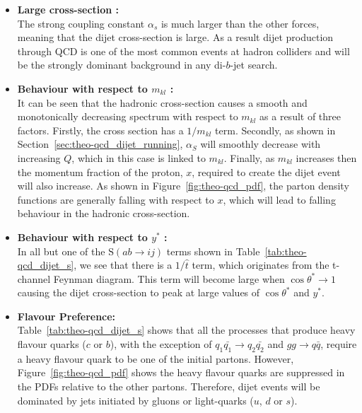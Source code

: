 \begin{itemize}[leftmargin=*]
\item\textbf{Large cross-section :}\\
  The strong coupling constant $\alpha_s$ is much larger than the other forces,
  meaning that the dijet cross-section is large.
  As a result dijet production through QCD is one of the most common events at hadron colliders
  and will be the strongly dominant background in any di-$b$-jet search.\vspace{0.5em}
  
\item\textbf{Behaviour with respect to $m_{kl}$ :}\\
  It can be seen that the hadronic cross-section causes
  a smooth and monotonically decreasing spectrum
  with respect to $m_{kl}$ as a result of three factors.
  Firstly, the cross section has a $1/m_{kl}$ term.
  Secondly, as shown in Section~\ref{sec:theo-qcd_dijet_running},
  $\alpha_S$ will smoothly decrease with increasing $Q$, which in this case is linked to $m_{kl}$.
  Finally, as $m_{kl}$ increases then the momentum fraction of the proton, $x$, required to create
  the dijet event will also increase.
  As shown in Figure~\ref{fig:theo-qcd_pdf}, the parton density functions are generally falling 
  with respect to $x$, which will lead to falling behaviour in the hadronic cross-section.
  \vspace{0.5em}
  
\item\textbf{Behaviour with respect to $y^*$ :}\\
  In all but one of the $\text{S}(ab \to ij)$ terms shown in Table~\ref{tab:theo-qcd_dijet_s},
  we see that there is a $1/\hat{t}$ term, which originates from the t-channel Feynman diagram.
  This term will become large when $\cos{\theta^*} \to 1$
  causing the dijet cross-section to peak at large values of $\cos{\theta^*}$ and $y^*$.
  \vspace{0.5em}

\item\textbf{Flavour Preference:}\\
  Table~\ref{tab:theo-qcd_dijet_s} shows that all the processes that produce heavy flavour quarks ($c$ or $b$),
  with the exception of $q_1 \bar{q_1} \to q_2 \bar{q_2}$ and $g g \to q \bar{q}$,
  require a heavy flavour quark to be one of the initial partons.
  However, Figure~\ref{fig:theo-qcd_pdf} shows the heavy flavour quarks are suppressed in
  the PDFs relative to the other partons.
  Therefore, dijet events will be dominated by jets initiated by gluons or light-quarks ($u$, $d$ or $s$).
  
  
\end{itemize}

